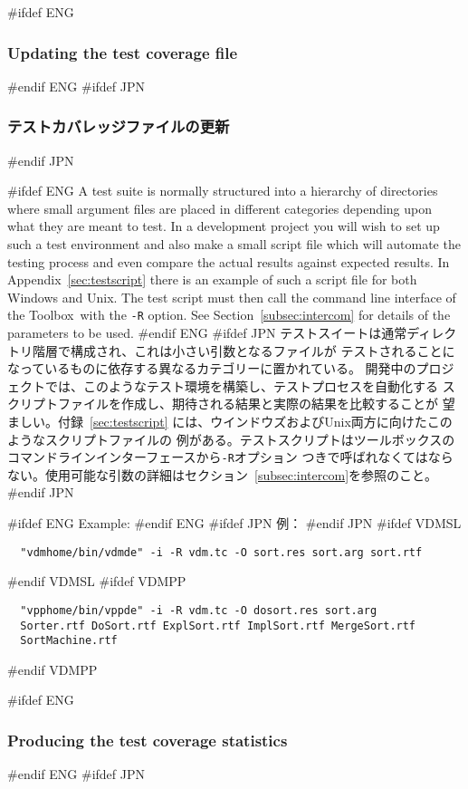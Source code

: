 \documentclass[\pformat,12pt]{article}
\newcommand{\Toolbox}{Toolbox}
\newcommand{\Toolbox}{Toolbox}
\begin{document}
#ifdef ENG
\subsubsection{Updating the test coverage file}
#endif ENG
#ifdef JPN
\subsubsection{テストカバレッジファイルの更新}
#endif JPN

#ifdef ENG
A test suite is normally structured into a hierarchy of directories
where small argument files are placed in different categories
depending upon what they are meant to test.  In a development project
you will wish to set up such a test environment and also make
a small script file which will automate the testing process and even
compare the actual results against expected results. In
Appendix~\ref{sec:testscript} 
there is an example of such a script file for both Windows and Unix.
The test script must then call the command line interface of the
\Toolbox\ with the {\tt -R} option. See Section~\ref{subsec:intercom}
for details of the parameters to be used.
#endif ENG
#ifdef JPN
テストスイートは通常ディレクトリ階層で構成され、これは小さい引数となるファイルが
テストされることになっているものに依存する異なるカテゴリーに置かれている。
開発中のプロジェクトでは、このようなテスト環境を構築し、テストプロセスを自動化する
スクリプトファイルを作成し、期待される結果と実際の結果を比較することが
望ましい。付録~\ref{sec:testscript} には、ウインドウズおよびUnix両方に向けたこのようなスクリプトファイルの
例がある。テストスクリプトはツールボックスのコマンドラインインターフェースから{\tt -R}オプション
つきで呼ばれなくてはならない。使用可能な引数の詳細はセクション~\ref{subsec:intercom}を参照のこと。
#endif JPN

#ifdef ENG
Example:
#endif ENG
#ifdef JPN
例：
#endif JPN
#ifdef VDMSL
\begin{verbatim}
  "vdmhome/bin/vdmde" -i -R vdm.tc -O sort.res sort.arg sort.rtf
\end{verbatim}
#endif VDMSL
#ifdef VDMPP
\begin{verbatim}
  "vpphome/bin/vppde" -i -R vdm.tc -O dosort.res sort.arg 
  Sorter.rtf DoSort.rtf ExplSort.rtf ImplSort.rtf MergeSort.rtf 
  SortMachine.rtf 
\end{verbatim}
#endif VDMPP

#ifdef ENG
\subsubsection{Producing the test coverage statistics}
#endif ENG
#ifdef JPN
\end{document}
